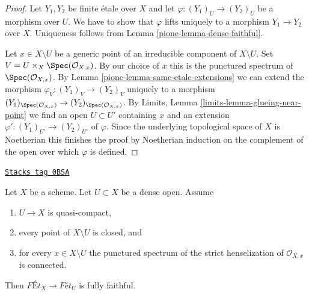 \begin{proof}

Let $Y_1, Y_2$ be finite \'etale over $X$ and let
$\varphi : (Y_1)_U \to (Y_2)_U$ be a morphism over $U$. We have to show that
$\varphi$ lifts uniquely to a morphism $Y_1 \to Y_2$ over $X$.
Uniqueness follows from Lemma \ref{pione-lemma-dense-faithful}.

\medskip\noindent
Let $x \in X \setminus U$ be a generic point of an irreducible component
of $X \setminus U$. Set $V = U \times_X \Spec(\mathcal{O}_{X, x})$.
By our choice of $x$ this is the punctured spectrum of
$\Spec(\mathcal{O}_{X, x})$. By
Lemma \ref{pione-lemma-same-etale-extensions}
we can extend the morphism $\varphi_V : (Y_1)_V \to (Y_2)_V$
uniquely to a morphism
$(Y_1)_{\Spec(\mathcal{O}_{X, x})} \to (Y_2)_{\Spec(\mathcal{O}_{X, x})}$.
By Limits, Lemma \ref{limits-lemma-glueing-near-point}
we find an open $U \subset U'$ containing $x$ and an extension
$\varphi' : (Y_1)_{U'} \to (Y_2)_{U'}$ of $\varphi$.
Since the underlying topological space of $X$ is Noetherian
this finishes the proof by Noetherian induction on the complement
of the open over which $\varphi$ is defined.
\end{proof}

\begin{lemma}
\label{pione-lemma-retrocompact-dense-open-connected-at-infinity-closed}
\href{https://stacks.math.columbia.edu/tag/0BSA}{\texttt{Stacks tag 0BSA}}

Let $X$ be a scheme. Let $U \subset X$ be a dense open. Assume
\begin{enumerate}
\item $U \to X$ is quasi-compact,
\item every point of $X \setminus U$ is closed, and
\item for every $x \in X \setminus U$ the punctured spectrum of the
strict henselization of $\mathcal{O}_{X, x}$ is connected.
\end{enumerate}
Then $\textit{F\'Et}_X \to \textit{F\'et}_U$ is fully faithful.
\end{lemma}

